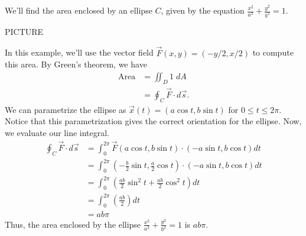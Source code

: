 \documentclass{ximera}
\begin{document}
\begin{example}
We'll find the area enclosed by an ellipse $C$, given by the equation $\frac{x^2}{a^2} + \frac{y^2}{b^2} = 1$.

PICTURE

In this example, we'll use the vector field $\vec{F}(x,y) = (-y/2, x/2)$ to compute this area. By Green's theorem, we have
\begin{align*}
\text{Area} &= \iint_D 1\;dA\\
&= \oint_{C}\vec{F}\cdot d\vec{s}.
\end{align*}
We can parametrize the ellipse as $\vec{x}(t) = (a\cos t, b\sin t)$ for $0\leq t\leq 2\pi$. Notice that this parametrization gives the correct orientation for the ellipse. Now, we evaluate our line integral.
\begin{align*}
\oint_{C}\vec{F}\cdot d\vec{s} &= \int_0^{2\pi} \vec{F}(a\cos t, b\sin t)\cdot (-a\sin t, b\cos t)dt\\
&= \int_0^{2\pi} \left(-\frac{b}{2}\sin t, \frac{a}{2}\cos t\right)\cdot (-a\sin t, b\cos t)dt\\
&= \int_0^{2\pi} \left(\frac{ab}{2}\sin^2 t + \frac{ab}{2}\cos^2 t\right)dt\\
&= \int_0^{2\pi} \left(\frac{ab}{2}\right)dt\\
&= ab\pi
\end{align*}
Thus, the area enclosed by the ellipse $\frac{x^2}{a^2} + \frac{y^2}{b^2} = 1$ is $ab\pi$.
\end{example}
\end{document}
